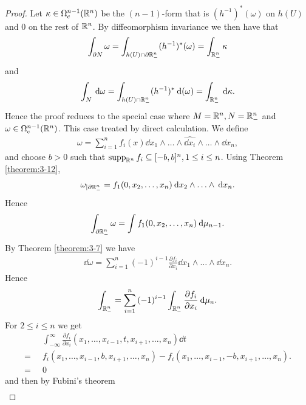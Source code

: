 \begin{proof}
  Let $\kappa\in\Omega^{n-1}_c({\mathbb{R}}^n)$ be the $(n-1)$-form that is $(h^{-1})^*(\omega)$ on 
  $h(U)$ and 0 on the rest of ${\mathbb{R}}^n$. By diffeomorphism invariance we then have that 
  \begin{align*}
    \int_{\partial N}\omega 
      = \int_{h(U)\cap \partial{\ensuremath{\mathbb{R}}}^n_-} (h^{-1})^*(\omega) 
      = \int_{{\mathbb{R}}^n_-} \kappa
  \end{align*}
  and 
  \begin{align*}
    \int_N \dd\omega
      = \int_{h(U)\cap \RR^n_-} (h^{-1})^* \dd(\omega) 
      = \int_{\RR^n_-} \dd\kappa.
  \end{align*}
  Hence the proof reduces to the special case where $M={\mathbb{R}}^n, N={\mathbb{R}}^n_-$ and 
  $\omega\in\Omega_c^{n-1}({\mathbb{R}}^n)$. This case treated by direct calculation. We define 
  \begin{align*}
    \omega = \sum_{i=1}^{n }{f_i(x)\dd x_1\wedge\ldots\wedge\widehat{\dd x_i}\wedge\ldots\wedge\dd x_n},
  \end{align*}
  and choose $b>0$ such that $\operatorname{supp}_{{\mathbb{R}}^n}f_i \subseteq [-b, b]^n, 1\le i\le n$. Using Theorem \ref{theorem:3-12},
  \begin{align*}
    \omega_{|\partial\RR^n_-}
    = f_1(0, x_2, \ldots, x_n)\dd x_2\wedge\ldots\wedge\dd x_n.
  \end{align*}
  Hence 
  \begin{align}\label{eq:10-3}
    \int_{\partial\RR^n_-}\omega 
    = \int f_1(0, x_2, \ldots, x_n)\dd\mu_{n-1}.
  \end{align}
  By Theorem \ref{theorem:3-7} we have 
  \begin{align*}
    \dd\omega 
    = \sum_{i=1}^{n}{(-1)^{i-1}\frac{\partial f_i}{\partial x_i}\dd x_1\wedge\ldots\wedge\dd x_n}.
  \end{align*}
  Hence 
  \begin{align}\label{eq:10-4}
    \int_{\RR^n_-}
    = \sum_{i=1}^{n}{(-1)^{i-1}\int_{\RR^n_-}\frac{\partial f_i}{\partial x_i}\dd\mu_n}.
  \end{align}
  For $2\le i\le n$ we get 
  \begin{align*}
    & \int_{-\infty}^\infty \frac{\partial f_i}{\partial x_i}(x_1, \ldots, x_{i-1}, t, x_{i+1}, \ldots, x_n)\dd t \\
    =\;\; & f_i(x_1, \ldots, x_{i-1}, b, x_{i+1}, \ldots, x_n) 
      - f_i(x_1, \ldots, x_{i-1}, -b, x_{i+1}, \ldots, x_n).\\
    =\;\; & 0
  \end{align*}
  and then by Fubini's theorem
  \begin{align}\label{eq:10-5}

\end{align}
\end{proof}
